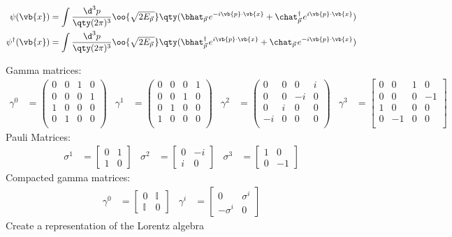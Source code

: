 \begin{align}
	\psi(\vb{x})&=\int\frac{\d^3p}{\qty(2\pi)^3}
	\oo{\sqrt{2E_{\ppp}}}
	\qty(\bhat_{\ppp}e^{-i\vb{p} \cdot \vb{x}} + \chat_{\ppp}^{\dagger}e^{i\vb{p} \cdot \vb{x}} )
	\\
	\psi^{\dagger}(\vb{x})&=\int\frac{\d^3p}{\qty(2\pi)^3}
	\oo{\sqrt{2E_{\ppp}}}
	\qty(\bhat_{\ppp}^{\dagger}e^{i\vb{p} \cdot \vb{x}} + \chat_{\ppp}e^{-i\vb{p} \cdot \vb{x}} )
\end{align}

Gamma matrices:
\begin{align*}
	\gamma^0&=
	\begin{pmatrix}
		0 & 0 & 1 & 0\\
		0 & 0 & 0 & 1\\
		1 & 0 & 0 & 0\\
		0 & 1 & 0 & 0\\
	\end{pmatrix}&
	\gamma^1&=
	\begin{pmatrix}
		0 & 0 & 0 & 1\\
		0 & 0 & 1 & 0\\
		0 & 1 & 0 & 0\\
		1 & 0 & 0 & 0\\
	\end{pmatrix}&
	\gamma^2&=
	\begin{pmatrix}
		 0 & 0 &  0 & i\\
		 0 & 0 & -i & 0\\
		 0 & i &  0 & 0\\
		-i & 0 &  0 & 0\\
	\end{pmatrix}&
	\gamma^3&=
	\begin{bmatrix}
		0 &  0 & 1 &  0\\
		0 &  0 & 0 & -1\\
		1 &  0 & 0 &  0\\
		0 & -1 & 0 &  0\\
	\end{bmatrix}&
\end{align*}
Pauli Matrices:
\begin{align*}
	\sigma^1&=\begin{bmatrix} 0 &  1 \\ 1 &  0 \end{bmatrix}&
	\sigma^2&=\begin{bmatrix} 0 & -i \\ i &  0 \end{bmatrix}&
	\sigma^3&=\begin{bmatrix} 1 &  0 \\ 0 & -1 \end{bmatrix}
\end{align*}
Compacted gamma matrices:
\begin{align*}
	\gamma^0&=\begin{bmatrix}0&\mathbb{I}\\\mathbb{I}&0\end{bmatrix}&
	\gamma^i&=\begin{bmatrix}0&\sigma^i\\-\sigma^i&0\end{bmatrix}
\end{align*}
Create a representation of the Lorentz algebra